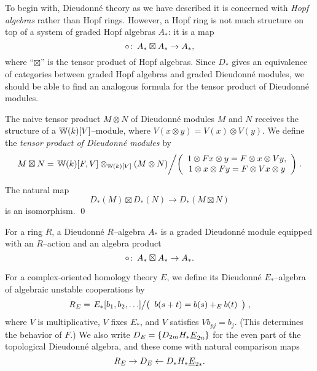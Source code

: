 To begin with, Dieudonn\'e theory as we have described it is concerned with \emph{Hopf algebras} rather than Hopf rings.  However, a Hopf ring is not much structure on top of a system of graded Hopf algebras $A_*$: it is a map \[\circ\colon\thinspace A_* \boxtimes A_* \to A_*,\] where ``$\boxtimes$'' is the tensor product of Hopf algebras.  Since $D_*$ gives an equivalence of categories between graded Hopf algebras and graded Dieudonn\'e modules, we should be able to find an analogous formula for the tensor product of Dieudonn\'e modules.

\begin{definition}
The naive tensor product $M \otimes N$ of Dieudonn\'e modules $M$ and $N$ receives the structure of a $\mathbb W(k)[V]$--module, where $V(x \otimes y) = V(x) \otimes V(y)$.  We define the \textit{tensor product of Dieudonn\'e modules} by \[M \boxtimes N = \left.\mathbb W(k)[F, V] \otimes_{\mathbb W(k)[V]} (M \otimes N) \middle/ \left( \begin{array}{c} 1 \otimes Fx \otimes y = F \otimes x \otimes Vy, \\ 1 \otimes x \otimes Fy = F \otimes Vx \otimes y \end{array} \right) \right. .\]
\end{definition}

\begin{lemma}
The natural map \[D_*(M) \boxtimes D_*(N) \to D_*(M \boxtimes N)\] is an isomorphism. \qed
\end{lemma}

\begin{definition}
For a ring $R$, a Dieudonn\'e $R$--algebra $A_*$ is a graded Dieudonn\'e module equipped with an $R$--action and an algebra product \[\circ\colon\thinspace A_* \boxtimes A_* \to A_*.\]
\end{definition}

\begin{example}
For a complex-oriented homology theory $E$, we define its Dieudonn\'e $E_*$--algebra of algebraic unstable cooperations by \[R_E = \left. E_*[b_1, b_2, \ldots] \middle/ \left( \begin{array}{c} b(s+t) = b(s) +_E b(t) \end{array} \right) \right.,\] where $V$ is multiplicative, $V$ fixes $E_*$, and $V$ satisfies $Vb_{pj} = b_j$.  (This determines the behavior of $F$.)  We also write $D_E = \{D_{2m} H_* \underline{\smash{E}}_{2n}\}$ for the even part of the topological Dieudonn\'e algebra, and these come with natural comparison maps \[R_E \to D_E \leftarrow D_* H_* \underline{\smash{E}}_{2*}.\]
\end{example}

